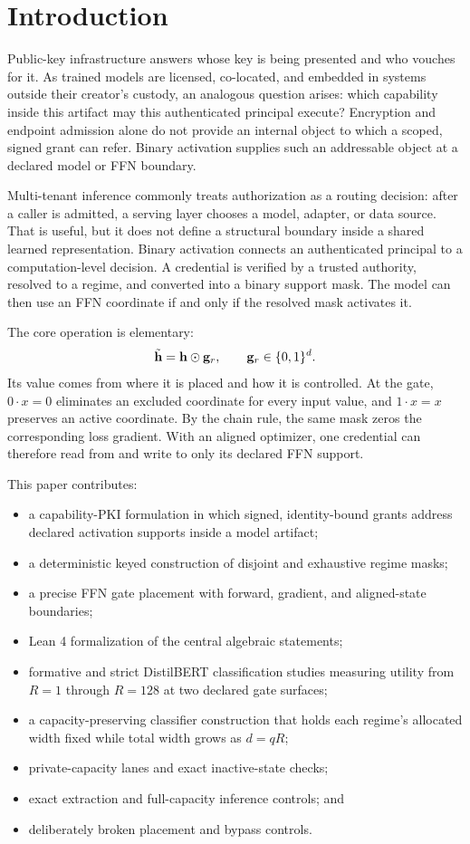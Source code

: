 \documentclass[11pt]{article}
\begin{document}
\section{Introduction}

Public-key infrastructure answers whose key is being presented and who vouches
for it. As trained models are licensed, co-located, and embedded in systems
outside their creator's custody, an analogous question arises: which capability
inside this artifact may this authenticated principal execute? Encryption and
endpoint admission alone do not provide an internal object to which a scoped,
signed grant can refer. Binary activation supplies such an addressable object at
a declared model or FFN boundary.

Multi-tenant inference commonly treats authorization as a routing decision:
after a caller is admitted, a serving layer chooses a model, adapter, or data
source. That is useful, but it does not define a structural boundary inside a
shared learned representation. Binary activation connects an authenticated
principal to a computation-level decision. A credential is verified by a
trusted authority, resolved to a regime, and converted into a binary support
mask. The model can then use an FFN coordinate if and only if the resolved mask
activates it.

The core operation is elementary:
\begin{equation}
  \tilde{\mathbf{h}}=\mathbf{h}\odot\mathbf{g}_r,
  \qquad \mathbf{g}_r\in\{0,1\}^d.
  \label{eq:gate}
\end{equation}
Its value comes from where it is placed and how it is controlled. At the gate,
$0\cdot x=0$ eliminates an excluded coordinate for every input value, and
$1\cdot x=x$ preserves an active coordinate. By the chain rule, the same mask
zeros the corresponding loss gradient. With an aligned optimizer, one
credential can therefore read from and write to only its declared FFN support.

This paper contributes:
\begin{itemize}
  \item a capability-PKI formulation in which signed, identity-bound grants
  address declared activation supports inside a model artifact;
  \item a deterministic keyed construction of disjoint and exhaustive regime
  masks;
  \item a precise FFN gate placement with forward, gradient, and aligned-state
  boundaries;
  \item Lean 4 formalization of the central algebraic statements;
  \item formative and strict DistilBERT classification studies measuring
  utility from $R=1$ through $R=128$ at two declared gate surfaces;
  \item a capacity-preserving classifier construction that holds each regime's
  allocated width fixed while total width grows as $d=qR$;
  \item private-capacity lanes and exact inactive-state checks;
  \item exact extraction and full-capacity inference controls; and
  \item deliberately broken placement and bypass controls.
\end{itemize}
\end{document}

